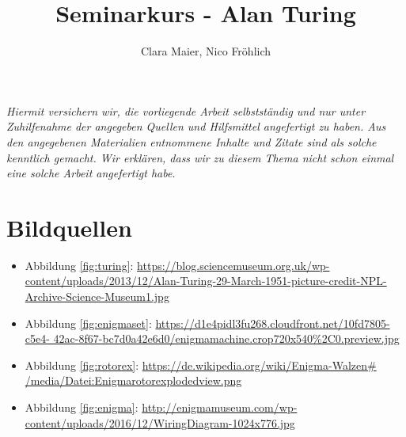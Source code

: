 \documentclass[11pt,a4paper]{article}
\author{Clara Maier, Nico Fröhlich}
\title{Seminarkurs - Alan Turing}
\renewcommand{\figurename}{Abbildung}
\newcommand{\picturesource}[2]{\item {\figurename} \ref{#1}: \href{#2}{#2}}
\begin{document}
\maketitle
\newpage
\emph{Hiermit versichern wir, die vorliegende Arbeit selbstständig und nur unter Zuhilfenahme der angegeben Quellen und Hilfsmittel angefertigt zu haben. Aus den angegebenen Materialien entnommene Inhalte und Zitate sind als solche kenntlich gemacht. Wir erklären, dass wir zu diesem Thema nicht schon einmal eine solche Arbeit angefertigt habe.}
\newpage

\tableofcontents
\newpage






\section*{Bildquellen}
{\renewcommand\labelitemi{}
\begin{itemize}
\picturesource{fig:turing}{https://blog.sciencemuseum.org.uk/wp-content/uploads/2013/12/Alan-Turing-29-March-1951-picture-credit-NPL-Archive-Science-Museum1.jpg}
\picturesource{fig:enigmaset}{https://d1e4pidl3fu268.cloudfront.net/10fd7805-c5e4-
42ac-8f67-bc7d0a42e6d0/enigma\textunderscore machine.crop\textunderscore 720x540\textunderscore 68\%2C0.preview.jpg}
\picturesource{fig:rotorex}{https://de.wikipedia.org/wiki/Enigma-Walzen\# /media/Datei:Enigma\textunderscore rotor\textunderscore exploded\textunderscore view.png}
\picturesource{fig:enigma}{http://enigmamuseum.com/wp-content/uploads/2016/12/WiringDiagram-1024x776.jpg}
\end{itemize}
}



\end{document}
